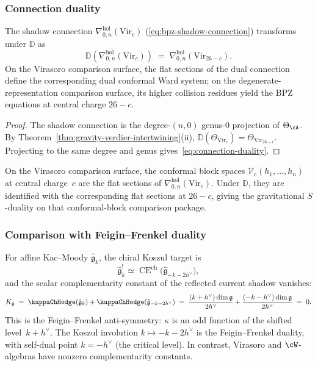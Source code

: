 \subsubsection*{Connection duality}

\begin{proposition}
\label{prop:gravity-connection-duality}
The shadow connection
$\nabla^{\mathrm{hol}}_{0,n}(\mathrm{Vir}_c)$
\textup{(}\eqref{eq:bpz-shadow-connection}\textup{)}
transforms under $\mathbb{D}$ as
\begin{equation}\label{eq:connection-duality}
\mathbb{D}\!\left(
 \nabla^{\mathrm{hol}}_{0,n}(\mathrm{Vir}_c)
\right)
\;=\;
\nabla^{\mathrm{hol}}_{0,n}(\mathrm{Vir}_{26-c}).
\end{equation}
On the Virasoro comparison surface, the flat sections of the dual
connection define the corresponding dual conformal Ward system; on the
degenerate-representation comparison surface, its higher collision
residues yield the BPZ equations at central charge $26 - c$.
\end{proposition}

\begin{proof}
The shadow connection is the degree-$(n,0)$ genus-$0$ projection of
$\Theta_\cA$. By Theorem~\ref{thm:gravity-verdier-intertwining}(ii),
$\mathbb{D}(\Theta_{\mathrm{Vir}_c})
= \Theta_{\mathrm{Vir}_{26-c}}$. Projecting to the same degree
and genus gives~\eqref{eq:connection-duality}.
\end{proof}

On the Virasoro comparison surface, the conformal block spaces
$\mathcal{V}_c(h_1, \ldots, h_n)$ at central charge~$c$ are the flat
sections of $\nabla^{\mathrm{hol}}_{0,n}(\mathrm{Vir}_c)$. Under
$\mathbb{D}$, they are identified with the corresponding flat sections
at $26-c$, giving the gravitational $S$-duality on that conformal-block
comparison package.

\subsubsection*{Comparison with Feigin--Frenkel duality}

For affine Kac--Moody $\hat{\mathfrak{g}}_k$, the chiral Koszul target is
\[
\hat{\mathfrak{g}}_k^!
\simeq
\operatorname{CE}^{\mathrm{ch}}\!\bigl(\hat{\mathfrak{g}}_{-k-2h^\vee}\bigr),
\]
and the scalar complementarity constant of the reflected current shadow
vanishes:
\[
K_{\hat{\mathfrak{g}}}
\;=\;
\kappaChHodge(\hat{\mathfrak{g}}_k)
+ \kappaChHodge(\hat{\mathfrak{g}}_{-k-2h^\vee})
\;=\;
\frac{(k+h^\vee)\dim\mathfrak{g}}{2h^\vee}
+ \frac{(-k-h^\vee)\dim\mathfrak{g}}{2h^\vee}
\;=\;
0.
\]
This is the Feigin--Frenkel anti-symmetry: $\kappa$ is an odd function
of the shifted level~$k + h^\vee$. The Koszul involution
$k \mapsto -k - 2h^\vee$ is the Feigin--Frenkel duality, with
self-dual point $k = -h^\vee$ (the critical level).
In contrast, Virasoro and $\cW$-algebras have nonzero complementarity
constants.

